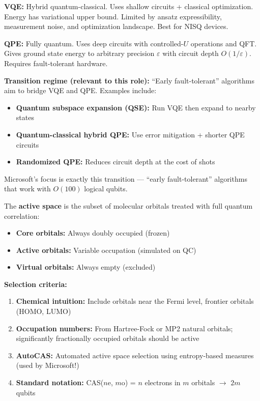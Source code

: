 \documentclass[11pt,a4paper]{article}
\begin{document}
\begin{answerbox}
\textbf{VQE:} Hybrid quantum-classical. Uses shallow circuits + classical optimization. Energy has variational upper bound. Limited by ansatz expressibility, measurement noise, and optimization landscape. Best for NISQ devices.

\textbf{QPE:} Fully quantum. Uses deep circuits with controlled-$U$ operations and QFT. Gives ground state energy to arbitrary precision $\varepsilon$ with circuit depth $O(1/\varepsilon)$. Requires fault-tolerant hardware.

\textbf{Transition regime (relevant to this role):} ``Early fault-tolerant'' algorithms aim to bridge VQE and QPE. Examples include:
\begin{itemize}
    \item \textbf{Quantum subspace expansion (QSE):} Run VQE then expand to nearby states
    \item \textbf{Quantum-classical hybrid QPE:} Use error mitigation + shorter QPE circuits
    \item \textbf{Randomized QPE:} Reduces circuit depth at the cost of shots
\end{itemize}
Microsoft's focus is exactly this transition --- ``early fault-tolerant'' algorithms that work with $O(100)$ logical qubits.
\end{answerbox}

\begin{answerbox}
The \textbf{active space} is the subset of molecular orbitals treated with full quantum correlation:
\begin{itemize}
    \item \textbf{Core orbitals:} Always doubly occupied (frozen)
    \item \textbf{Active orbitals:} Variable occupation (simulated on QC)
    \item \textbf{Virtual orbitals:} Always empty (excluded)
\end{itemize}
\textbf{Selection criteria:}
\begin{enumerate}
    \item \textbf{Chemical intuition:} Include orbitals near the Fermi level, frontier orbitals (HOMO, LUMO)
    \item \textbf{Occupation numbers:} From Hartree-Fock or MP2 natural orbitals; significantly fractionally occupied orbitals should be active
    \item \textbf{AutoCAS:} Automated active space selection using entropy-based measures (used by Microsoft!)
    \item \textbf{Standard notation:} CAS($n$e, $m$o) = $n$ electrons in $m$ orbitals $\to$ $2m$ qubits
\end{enumerate}
\end{answerbox}
\end{document}
